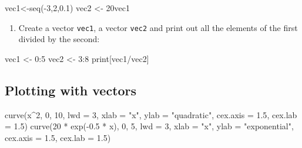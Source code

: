 \documentclass[
  letterpaper,
  DIV=11,
  numbers=noendperiod]{scrreprt}
\newenvironment{Shaded}{\begin{snugshade}}{\end{snugshade}}
\newcommand{\AttributeTok}[1]{\textcolor[rgb]{0.40,0.45,0.13}{#1}}
\newcommand{\DecValTok}[1]{\textcolor[rgb]{0.68,0.00,0.00}{#1}}
\newcommand{\FloatTok}[1]{\textcolor[rgb]{0.68,0.00,0.00}{#1}}
\newcommand{\FunctionTok}[1]{\textcolor[rgb]{0.28,0.35,0.67}{#1}}
\newcommand{\NormalTok}[1]{\textcolor[rgb]{0.00,0.23,0.31}{#1}}
\newcommand{\OtherTok}[1]{\textcolor[rgb]{0.00,0.23,0.31}{#1}}
\newcommand{\SpecialCharTok}[1]{\textcolor[rgb]{0.37,0.37,0.37}{#1}}
\newcommand{\StringTok}[1]{\textcolor[rgb]{0.13,0.47,0.30}{#1}}
\providecommand{\tightlist}{%
  \setlength{\itemsep}{0pt}\setlength{\parskip}{0pt}}\usepackage{longtable,booktabs,array}
\begin{document}
\begin{Shaded}
\begin{Highlighting}[]
\NormalTok{vec1}\OtherTok{\textless{}{-}}\FunctionTok{seq}\NormalTok{(}\SpecialCharTok{{-}}\DecValTok{3}\NormalTok{,}\DecValTok{2}\NormalTok{,}\FloatTok{0.1}\NormalTok{)}
\NormalTok{vec2 }\OtherTok{\textless{}{-}}\NormalTok{ 20vec1}
\end{Highlighting}
\end{Shaded}

\begin{enumerate}
\def\labelenumi{\arabic{enumi}.}
\setcounter{enumi}{6}
\tightlist
\item
  Create a vector \texttt{vec1}, a vector \texttt{vec2} and print out
  all the elements of the first divided by the second:
\end{enumerate}

\begin{Shaded}
\begin{Highlighting}[]
\NormalTok{vec1 }\OtherTok{\textless{}{-}} \DecValTok{0}\SpecialCharTok{:}\DecValTok{5}
\NormalTok{vec2 }\OtherTok{\textless{}{-}} \DecValTok{3}\SpecialCharTok{:}\DecValTok{8}
\NormalTok{print[vec1}\SpecialCharTok{/}\NormalTok{vec2]}
\end{Highlighting}
\end{Shaded}

\hypertarget{plotting-with-vectors}{%
\subsection{Plotting with vectors}\label{plotting-with-vectors}}

\begin{Shaded}
\begin{Highlighting}[]
\FunctionTok{curve}\NormalTok{(x}\SpecialCharTok{\^{}}\DecValTok{2}\NormalTok{, }\DecValTok{0}\NormalTok{, }\DecValTok{10}\NormalTok{, }\AttributeTok{lwd =} \DecValTok{3}\NormalTok{, }\AttributeTok{xlab =} \StringTok{"x"}\NormalTok{, }\AttributeTok{ylab =} \StringTok{"quadratic"}\NormalTok{,}
    \AttributeTok{cex.axis =} \FloatTok{1.5}\NormalTok{, }\AttributeTok{cex.lab =} \FloatTok{1.5}\NormalTok{)}
\FunctionTok{curve}\NormalTok{(}\DecValTok{20} \SpecialCharTok{*} \FunctionTok{exp}\NormalTok{(}\SpecialCharTok{{-}}\FloatTok{0.5} \SpecialCharTok{*}\NormalTok{ x), }\DecValTok{0}\NormalTok{, }\DecValTok{5}\NormalTok{, }\AttributeTok{lwd =} \DecValTok{3}\NormalTok{, }\AttributeTok{xlab =} \StringTok{"x"}\NormalTok{,}
    \AttributeTok{ylab =} \StringTok{"exponential"}\NormalTok{, }\AttributeTok{cex.axis =} \FloatTok{1.5}\NormalTok{, }\AttributeTok{cex.lab =} \FloatTok{1.5}\NormalTok{)}
\end{Highlighting}
\end{Shaded}
\end{document}
